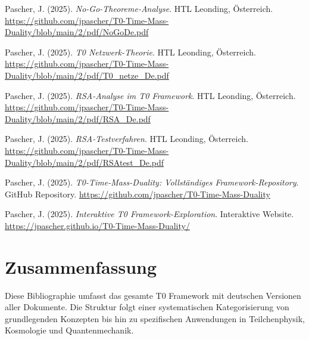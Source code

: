 \documentclass{article}
\begin{document}
\begin{thebibliography}{99}
		Pascher, J. (2025).
		\textit{No-Go-Theoreme-Analyse}.
		HTL Leonding, Österreich.
		\url{https://github.com/jpascher/T0-Time-Mass-Duality/blob/main/2/pdf/NoGoDe.pdf}
		
		Pascher, J. (2025).
		\textit{T0 Netzwerk-Theorie}.
		HTL Leonding, Österreich.
		\url{https://github.com/jpascher/T0-Time-Mass-Duality/blob/main/2/pdf/T0_netze_De.pdf}
		
		
		Pascher, J. (2025).
		\textit{RSA-Analyse im T0 Framework}.
		HTL Leonding, Österreich.
		\url{https://github.com/jpascher/T0-Time-Mass-Duality/blob/main/2/pdf/RSA_De.pdf}
		
		Pascher, J. (2025).
		\textit{RSA-Testverfahren}.
		HTL Leonding, Österreich.
		\url{https://github.com/jpascher/T0-Time-Mass-Duality/blob/main/2/pdf/RSAtest_De.pdf}
		
		
		Pascher, J. (2025).
		\textit{T0-Time-Mass-Duality: Vollständiges Framework-Repository}.
		GitHub Repository.
		\url{https://github.com/jpascher/T0-Time-Mass-Duality}
		
		Pascher, J. (2025).
		\textit{Interaktive T0 Framework-Exploration}.
		Interaktive Website.
		\url{https://jpascher.github.io/T0-Time-Mass-Duality/}
		
	\end{thebibliography}
	
	\section{Zusammenfassung}
	Diese Bibliographie umfasst das gesamte T0 Framework mit deutschen Versionen aller Dokumente. Die Struktur folgt einer systematischen Kategorisierung von grundlegenden Konzepten bis hin zu spezifischen Anwendungen in Teilchenphysik, Kosmologie und Quantenmechanik.
	
\end{document}
